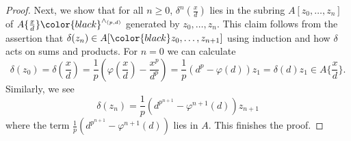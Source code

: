 \documentclass{amsart}
\theoremstyle{plain}
\theoremstyle{definition}
\newcommand{\Z}{\mathbb{Z}}
\newcommand{\red}[1]{{\color{black} #1}}
\newcommand{\green}[1]{{\color{black}#1}}
\newcommand{\blue}[1]{{\color{black}#1}}
\begin{document}
\begin{proof}
\blue{Next, we show that for all $n\geq 0$, $\delta^n(\frac{x}{d})$ lies in the subring $A[z_0,\ldots, z_{n}]$ of $A\{\frac{x}{d}\}\red{^{\wedge_{(p,d)}}}$ generated by $z_0,\ldots,z_{n}$}. This claim follows from the assertion that $\delta(z_{n})\in A[\green{z_0},\ldots, z_{n+1}]$ using induction and how $\delta$ acts on sums and products. For $n=0$ we can calculate
  $$
  \delta(z_0)=\delta(\frac{x}{d})=\frac{1}{p}(\varphi(\frac{x}{d})-\frac{x^p}{d^p})=\frac{1}{p}(d^p-\varphi(d))z_{1}=\delta(d)z_1\in A\{\frac{x}{d}\}.
  $$
  Similarly, we see
  $$
  \delta(z_n)=\frac{1}{p}(d^{p^{n+1}}-\varphi^{n+1}(d))z_{n+1}
  $$
  where the term $\frac{1}{p}(d^{p^{n+1}}-\varphi^{n+1}(d))$ lies in $A$. This finishes the proof. 
\end{proof}
\end{document}
